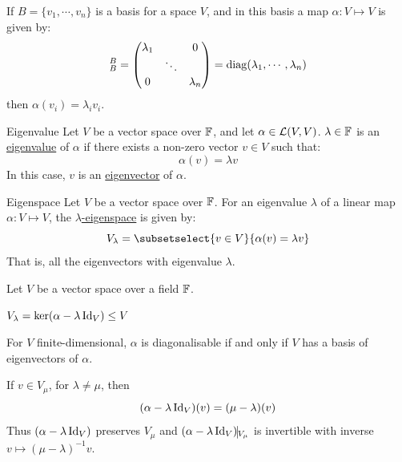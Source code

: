\documentclass[../Main.tex]{subfiles}
\begin{document}
If $B = \{v_1, \cdots, v_n\}$ is a basis for a space $V$, and in this basis a map $\alpha : V \mapsto V$ is given by:
\begin{equation*}
    [\alpha]_B^B =
    \begin{pmatrix}
        \lambda_1 &  & 0 \\
         & \ddots &  \\
        0 &  & \lambda_n
    \end{pmatrix}
    = \diag(\lambda_1, \cdots, \lambda_n)
\end{equation*}
then $\alpha(v_i) = \lambda_i v_i$.
\begin{definition}{Eigenvalue}
    Let $V$ be a vector space over $\mathbb{F}$, and let $\alpha \in \mathcal{L}(V, V)$. $\lambda \in \mathbb{F}$ is an \underline{eigenvalue} of $\alpha$ if there exists a non-zero vector $v \in V$ such that:
    \begin{equation*}
        \alpha(v) = \lambda v
    \end{equation*}
    In this case, $v$ is an \underline{eigenvector} of $\alpha$.
\end{definition}
\begin{definition}{Eigenspace}
    Let $V$ be a vector space over $\mathbb{F}$. For an eigenvalue $\lambda$ of a linear map $\alpha : V \mapsto V$, the \underline{$\lambda$-eigenspace} is given by:
    \begin{equation*}
        V_{\lambda} = \subsetselect{v \in V}{\alpha(v) = \lambda v}
    \end{equation*}
    That is, all the eigenvectors with eigenvalue $\lambda$.
\end{definition}
\begin{propositions}{
        Let $V$ be a vector space over a field $\mathbb{F}$.
        \label{propsEVals}
    }
    \item $V_\lambda = \ker(\alpha - \lambda \operatorname{Id}_V) \leq V$ \label{propEValKernel}
    \item For $V$ finite-dimensional, $\alpha$ is diagonalisable if and only if $V$ has a basis of eigenvectors of $\alpha$. \label{propDiagIffBasis}
    \item If $v \in V_{\mu}$, for $\lambda \neq \mu$, then
        \begin{equation*}
            (\alpha - \lambda \operatorname{Id}_V) (v) = (\mu - \lambda)(v)
        \end{equation*}
        Thus $(\alpha - \lambda \operatorname{Id}_V)$ preserves $V_{\mu}$ and $(\alpha - \lambda \Id_V) \vline_{V_\mu}$ is invertible with inverse $v \mapsto (\mu - \lambda)^{-1} v$.
        \label{propEValDifferentKernel}
\end{propositions}
\end{document}
